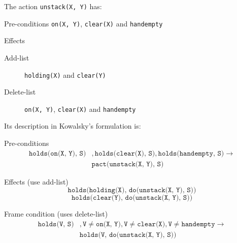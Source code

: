 \begin{example}
    The action \texttt{unstack(X, Y)} has:
    \begin{descriptionlist}
        \item[Pre-conditions] \texttt{on(X, Y)}, \texttt{clear(X)} and \texttt{handempty}
        \item[Effects] \phantom{}
        \begin{description}
            \item[Add-list] \texttt{holding(X)} and \texttt{clear(Y)}
            \item[Delete-list] \texttt{on(X, Y)}, \texttt{clear(X)} and \texttt{handempty}
        \end{description}
    \end{descriptionlist}

    Its description in Kowalsky's formulation is:
    \begin{descriptionlist}
        \item[Pre-conditions] 
            \[ 
                \begin{split}
                    \texttt{holds(on(X, Y), S)}&, \texttt{holds(clear(X), S)}, \texttt{holds(handempty, S)} \rightarrow \\
                    &\texttt{pact(unstack(X, Y), S)} 
                \end{split}
            \]
        
        \item[Effects] (use add-list)
            \[ \texttt{holds(holding(X), do(unstack(X, Y), S))} \]
            \[ \texttt{holds(clear(Y), do(unstack(X, Y), S))} \]
        
        \item[Frame condition] (uses delete-list)
            \[ 
                \begin{split}
                    \texttt{holds(V, S)}&, \texttt{V} \neq \texttt{on(X, Y)}, \texttt{V} \neq \texttt{clear(X)}, \texttt{V} \neq \texttt{handempty}
                    \rightarrow \\
                    & \texttt{holds(V, do(unstack(X, Y), S))}
                \end{split}
            \]
    \end{descriptionlist}
\end{example}